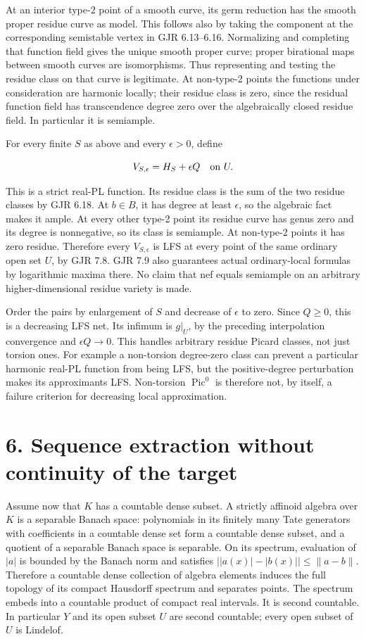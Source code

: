 \documentclass[11pt]{article}
\begin{document}
At an interior type-2 point of a smooth curve, its germ reduction has the smooth proper residue curve as model. This follows also by taking the component at the corresponding semistable vertex in GJR 6.13--6.16. Normalizing and completing that function field gives the unique smooth proper curve; proper birational maps between smooth curves are isomorphisms. Thus representing and testing the residue class on that curve is legitimate. At non-type-2 points the functions under consideration are harmonic locally; their residue class is zero, since the residual function field has transcendence degree zero over the algebraically closed residue field. In particular it is semiample.

For every finite $S$ as above and every $\epsilon>0$, define

\[V_{S,\epsilon}=H_S+\epsilon Q\quad\hbox{on }U.\]

This is a strict real-PL function. Its residue class is the sum of the two residue classes by GJR 6.18. At $b\in B$, it has degree at least $\epsilon$, so the algebraic fact makes it ample. At every other type-2 point its residue curve has genus zero and its degree is nonnegative, so its class is semiample. At non-type-2 points it has zero residue. Therefore every $V_{S,\epsilon}$ is LFS at every point of the same ordinary open set $U$, by GJR 7.8. GJR 7.9 also guarantees actual ordinary-local formulas by logarithmic maxima there. No claim that nef equals semiample on an arbitrary higher-dimensional residue variety is made.

Order the pairs by enlargement of $S$ and decrease of $\epsilon$ to zero. Since $Q\geq0$, this is a decreasing LFS net. Its infimum is $g|_U$, by the preceding interpolation convergence and $\epsilon Q\to0$. This handles arbitrary residue Picard classes, not just torsion ones. For example a non-torsion degree-zero class can prevent a particular harmonic real-PL function from being LFS, but the positive-degree perturbation makes its approximants LFS. Non-torsion $\operatorname{Pic}^0$ is therefore not, by itself, a failure criterion for decreasing local approximation.

\section*{6. Sequence extraction without continuity of the target}

Assume now that $K$ has a countable dense subset. A strictly affinoid algebra over $K$ is a separable Banach space: polynomials in its finitely many Tate generators with coefficients in a countable dense set form a countable dense subset, and a quotient of a separable Banach space is separable. On its spectrum, evaluation of $|a|$ is bounded by the Banach norm and satisfies $\big||a(x)|-|b(x)|\big|\leq\|a-b\|$. Therefore a countable dense collection of algebra elements induces the full topology of its compact Hausdorff spectrum and separates points. The spectrum embeds into a countable product of compact real intervals. It is second countable. In particular $Y$ and its open subset $U$ are second countable; every open subset of $U$ is Lindelof.
\end{document}
